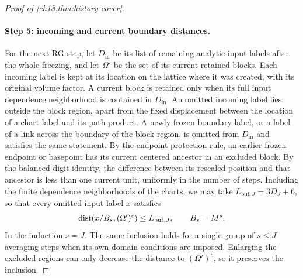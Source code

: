 \begin{proof}[Proof of \cref{ch18:thm:history-cover}]
\paragraph{Step 5: incoming and current boundary distances.}
For the next RG step, let $D_{\mathrm{in}}$ be its list of remaining analytic input labels after the whole freezing, and let $\Omega'$ be the set of its current retained blocks. Each incoming label is kept at its location on the lattice where it was created, with its original volume factor. A current block is retained only when its full input dependence neighborhood is contained in $D_{\mathrm{in}}$. An omitted incoming label lies outside the block region, apart from the fixed displacement between the location of a chart label and its path product. A newly frozen boundary label, or a label of a link across the boundary of the block region, is omitted from $D_{\mathrm{in}}$ and satisfies the same statement. By the endpoint protection rule, an earlier frozen endpoint or basepoint has its current centered ancestor in an excluded block. By the balanced-digit identity, the difference between its rescaled position and that ancestor is less than one current unit, uniformly in the number of steps. Including the finite dependence neighborhoods of the charts, we may take $L_{\mathrm{buf},J}=3D_J+6$, so that every omitted input label $x$ satisfies
\begin{equation}\label{ch18:eq:old-complement-inclusion}
 \operatorname{dist}(x/B_s,(\Omega')^c)\le L_{\mathrm{buf},J},
                    \qquad B_s=M^s.
\end{equation}
In the induction $s=J$. The same inclusion holds for a single group of $s\le J$ averaging steps when its own domain conditions are imposed. Enlarging the excluded regions can only decrease the distance to $(\Omega')^c$, so it preserves the inclusion.


\end{proof}
